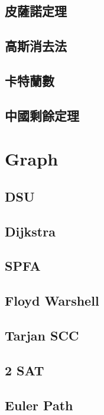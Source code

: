 \subsection{皮薩諾定理} 

\subsection{高斯消去法}

\subsection{卡特蘭數}

\subsection{中國剩餘定理}


\section{Graph}
\subsection{DSU} 

\subsection{Dijkstra} 

\subsection{SPFA} 

\subsection{Floyd Warshell} 

\subsection{Tarjan SCC} 

\subsection{2 SAT} 

\subsection{Euler Path}

% 

